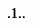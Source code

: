 \documentclass{article}
\newcommand{\unicode}[1]{{}}
\begin{document}
\begin{doublespace}
\noindent\(\pmb{}\\
\pmb{\unicode{0420}\unicode{0438}\unicode{0441}. 1. \unicode{0417}\unicode{0430}\unicode{0432}\unicode{0438}\unicode{0441}\unicode{0438}\unicode{043c}\unicode{043e}\unicode{0441}\unicode{0442}\unicode{044c}
\unicode{043e}\unicode{0431}\unicode{0440}\unicode{0430}\unicode{0442}\unicode{043d}\unicode{043e}\unicode{0439} \unicode{0432}\unicode{0435}\unicode{043b}\unicode{0438}\unicode{0447}\unicode{0438}\unicode{043d}\unicode{044b}
\unicode{043c}\unicode{0430}\unicode{0433}\unicode{043d}\unicode{0438}\unicode{0442}\unicode{043d}\unicode{043e}\unicode{0439} \unicode{0432}\unicode{043e}\unicode{0441}\unicode{043f}\unicode{0440}\unicode{0438}\unicode{0438}\unicode{043c}\unicode{0447}\unicode{0438}\unicode{0432}\unicode{043e}\unicode{0441}\unicode{0442}\unicode{0438}
\unicode{043e}\unicode{0442} \unicode{0442}\unicode{0435}\unicode{043c}\unicode{043f}\unicode{0435}\unicode{0440}\unicode{0430}\unicode{0442}\unicode{0443}\unicode{0440}\unicode{044b}.}\)
\end{doublespace}
\end{document}

